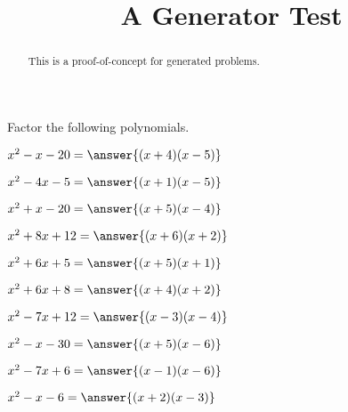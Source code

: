 \documentclass{ximera}
\begin{document}
\title{A Generator Test}
\begin{abstract}
This is a proof-of-concept for generated problems.
\end{abstract}
\maketitle

Factor the following polynomials.

\begin{question}
  $x^2 - x - 20 = \answer{(x + 4)(x - 5)}$
\end{question}

\begin{question}
  $x^2 - 4x - 5 = \answer{(x + 1)(x - 5)}$
\end{question}

\begin{question}
  $x^2 + x - 20 = \answer{(x + 5)(x - 4)}$
\end{question}

\begin{question}
  $x^2 + 8x + 12 = \answer{(x + 6)(x + 2)}$
\end{question}

\begin{question}
  $x^2 + 6x + 5 = \answer{(x + 5)(x + 1)}$
\end{question}

\begin{question}
  $x^2 + 6x + 8 = \answer{(x + 4)(x + 2)}$
\end{question}

\begin{question}
  $x^2 - 7x + 12 = \answer{(x - 3)(x - 4)}$
\end{question}

\begin{question}
  $x^2 - x - 30 = \answer{(x + 5)(x - 6)}$
\end{question}

\begin{question}
  $x^2 - 7x + 6 = \answer{(x - 1)(x - 6)}$
\end{question}

\begin{question}
  $x^2 - x - 6 = \answer{(x + 2)(x - 3)}$
\end{question}
\end{document}
